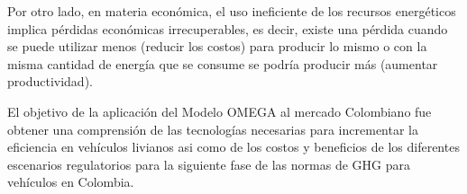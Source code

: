 Por otro lado, en materia económica, el uso ineficiente de los recursos energéticos implica pérdidas económicas irrecuperables, es decir, existe una pérdida cuando se puede utilizar menos (reducir los costos) para producir lo mismo o con la misma cantidad de energía que se consume se podría producir más (aumentar productividad).

El objetivo de la aplicación del Modelo OMEGA al mercado Colombiano fue obtener una comprensión de las tecnologías necesarias para incrementar la eficiencia en vehículos livianos asi como de los costos y beneficios de los diferentes escenarios regulatorios para la siguiente fase de las normas de GHG para vehículos en Colombia.